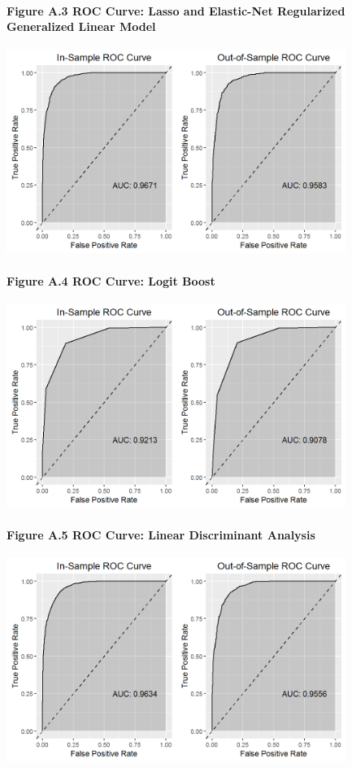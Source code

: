 \documentclass[]{article}
\let\oldparagraph\paragraph
\renewcommand{\paragraph}[1]{\oldparagraph{#1}\mbox{}}
\begin{document}
\paragraph{Figure A.3 ROC Curve: Lasso and Elastic-Net Regularized
Generalized Linear
Model}\label{figure-a.3-roc-curve-lasso-and-elastic-net-regularized-generalized-linear-model}

\includegraphics[height=2.60417in]{images/resp_glm_sample_roc.png}

\newpage

\paragraph{Figure A.4 ROC Curve: Logit
Boost}\label{figure-a.4-roc-curve-logit-boost}

\includegraphics[height=2.60417in]{images/resp_lboost_sample_roc.png}

\paragraph{Figure A.5 ROC Curve: Linear Discriminant
Analysis}\label{figure-a.5-roc-curve-linear-discriminant-analysis}

\includegraphics[height=2.60417in]{images/resp_lda_sample_roc.png}
\end{document}
